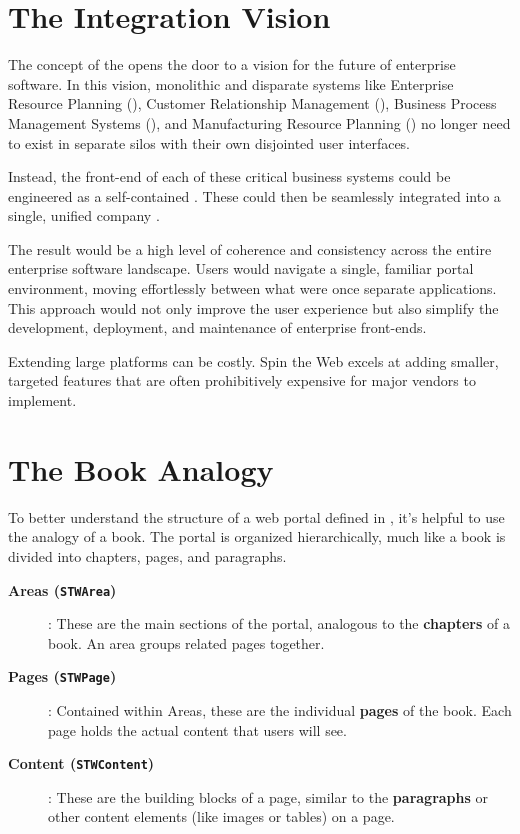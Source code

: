 \section{The Integration Vision}
\label{sec:integration-vision}

The concept of the \textbf{\webbaselet{}} opens the door to a vision for the future of enterprise software. In this vision, monolithic and disparate systems like Enterprise Resource Planning (\erp{}), Customer Relationship Management (\crm{}), Business Process Management Systems (\bpms{}), and Manufacturing Resource Planning (\mrp{}) no longer need to exist in separate silos with their own disjointed user interfaces.

Instead, the front-end of each of these critical business systems could be engineered as a self-contained \textbf{\webbaselet{}}. These  could then be seamlessly integrated into a single, unified company \textbf{\webbase{}}.

The result would be a high level of coherence and consistency across the entire enterprise software landscape. Users would navigate a single, familiar portal environment, moving effortlessly between what were once separate applications. This approach would not only improve the user experience but also simplify the development, deployment, and maintenance of enterprise front-ends.

Extending large platforms can be costly. Spin the Web excels at adding smaller, targeted features that are often prohibitively expensive for major vendors to implement.

\section{The Book Analogy}
\label{sec:book-analogy}

To better understand the structure of a web portal defined in \wbdl{}, it's helpful to use the analogy of a book. The portal is organized hierarchically, much like a book is divided into chapters, pages, and paragraphs.

\begin{description}
\item[\textbf{Areas (\texttt{STWArea})}]: These are the main sections of the portal, analogous to the \textbf{chapters} of a book. An area groups related pages together.
\item[\textbf{Pages (\texttt{STWPage})}]: Contained within Areas, these are the individual \textbf{pages} of the book. Each page holds the actual content that users will see.
\item[\textbf{Content (\texttt{STWContent})}]: These are the building blocks of a page, similar to the \textbf{paragraphs} or other content elements (like images or tables) on a page.
\end{description}

